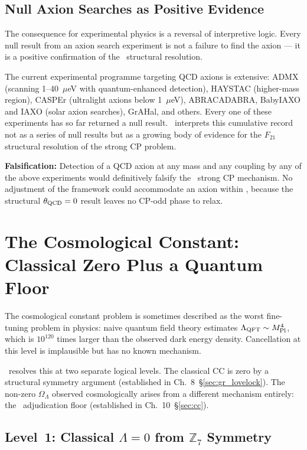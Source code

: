 \documentclass[11pt,openany]{book}
\theoremstyle{remark}
\newcommand{\GTE}{\text{GTE}}
\newcommand{\PSC}{\text{PSC}}
\begin{document}
\subsection*{Null Axion Searches as Positive Evidence}

The consequence for experimental physics is a reversal of interpretive logic.  Every
null result from an axion search experiment is not a failure to find the axion --- it
is a positive confirmation of the \GTE\ structural resolution.

The current experimental programme targeting QCD axions is extensive: ADMX
(scanning 1--40~$\mu$eV with quantum-enhanced detection), HAYSTAC (higher-mass
region), CASPEr (ultralight axions below 1~$\mu$eV), ABRACADABRA, BabyIAXO and
IAXO (solar axion searches), GrAHal, and others.  Every one of these experiments
has so far returned a null result.  \GTE\ interprets this cumulative record not as
a series of null results but as a growing body of evidence for the $F_{21}$ structural
resolution of the strong CP problem.

\textbf{Falsification:}  Detection of a QCD axion at any mass and any coupling by any
of the above experiments would definitively falsify the \GTE\ strong CP mechanism.
No adjustment of the framework could accommodate an axion within \GTE, because the
structural $\theta_{\rm QCD} = 0$ result leaves no CP-odd phase to relax.

\section{The Cosmological Constant: Classical Zero Plus a Quantum Floor}
\label{sec:cc_new_physics}

The cosmological constant problem is sometimes described as the worst fine-tuning
problem in physics: naive quantum field theory estimates $\Lambda_{\rm QFT} \sim M_{\rm Pl}^4$,
which is $10^{120}$ times larger than the observed dark energy density.  Cancellation
at this level is implausible but has no known mechanism.

\GTE\ resolves this at two separate logical levels.  The classical CC is zero by a
structural symmetry argument (established in Ch.~8~\S\ref{sec:gr_lovelock}).  The
non-zero $\Omega_\Lambda$ observed cosmologically arises from a different mechanism
entirely: the \PSC\ adjudication floor (established in Ch.~10~\S\ref{sec:cc}).

\subsection*{Level~1: Classical $\Lambda = 0$ from $\mathbb{Z}_7$ Symmetry}
\end{document}
